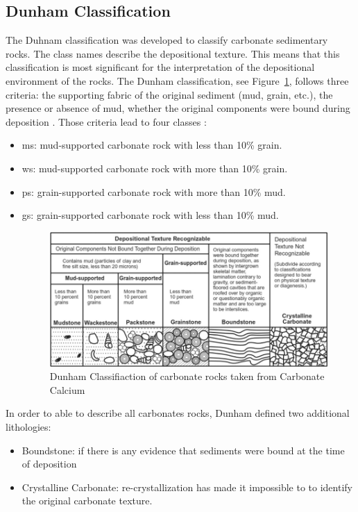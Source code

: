 \subsection{Dunham Classification}
The Duhnam classification was developed to classify carbonate sedimentary rocks. The class names describe the depositional texture. This means that this classification is most significant for the interpretation of the depositional environment of the rocks. The Dunham classification, see Figure~\ref{fig:dunham}, follows three criteria: the supporting fabric of the original sediment (mud, grain, etc.), the presence or absence of mud, whether the original components were bound during deposition \cite{dunhamrevised}.
Those criteria lead to four classes :
\begin{itemize}
    \item \gls{ms}: mud-supported carbonate rock with less than 10\% grain.
    \item \gls{ws}: mud-supported carbonate rock with more than 10\% grain.
    \item \gls{ps}: grain-supported carbonate rock with more than 10\% mud.
    \item \gls{gs}: grain-supported carbonate rock with less than 10\% mud.
	\begin{figure}[!htp]
    \centering
        \includegraphics[width=1\textwidth]{figures/02-Dunhams-classification}
        \caption[Dunham Classifcation]{Dunham Classifiaction of carbonate rocks taken from Carbonate Calcium \cite{dunhamfig}}\label{fig:dunham}
    \end{figure}
\end{itemize}
In order to able to describe all carbonates rocks, Dunham defined two additional lithologies: 
\begin{itemize}
    \item Boundstone: if there is any evidence that sediments were bound at the time of deposition
    \item Crystalline Carbonate: re-crystallization has made it impossible to to identify the original carbonate texture.
\end{itemize}

